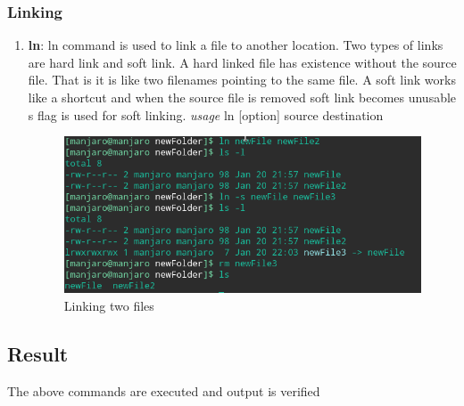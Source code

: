 \documentclass{article}
\begin{document}
\subsubsection{Linking}
\begin{enumerate}
    \item {\bf ln}: ln command is used to link a file to another location. Two types of links are hard link and soft link. A hard linked file has existence without the source file. That is it is like two filenames pointing to the same file. A soft link works like a shortcut and when the source file is removed soft link becomes unusable s flag is used for soft linking.
    \newline
    \hspace{\parindent} {\em usage} ln [option] source destination
    
    \begin{figure}[h!]
        \centering
        \includegraphics[width=.83\textwidth]{img/p2/ss10.png}
        \caption{Linking two files}
    \end{figure}
\end{enumerate}
\subsection{Result}
The above commands are executed and output is verified
\end{document}
